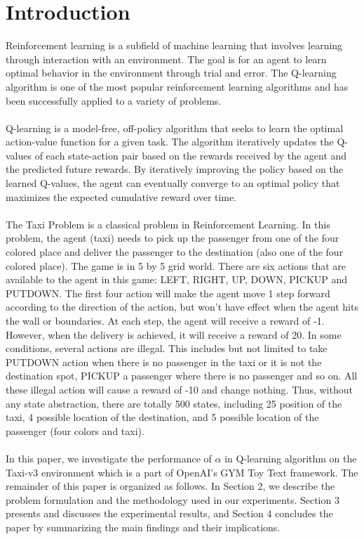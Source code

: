 \documentclass[conference]{IEEEtran}
\begin{document}
\section{Introduction}
Reinforcement learning is a subfield of machine learning that involves learning through interaction with an environment. The goal is for an agent to learn optimal behavior in the environment through trial and error. The Q-learning algorithm is one of the most popular reinforcement learning algorithms and has been successfully applied to a variety of problems. \\ \\ Q-learning \cite{1} is a model-free, off-policy algorithm that seeks to learn the optimal action-value function for a given task. The algorithm iteratively updates the Q-values of each state-action pair based on the rewards received by the agent and the predicted future rewards. By iteratively improving the policy based on the learned Q-values, the agent can eventually converge to an optimal policy that maximizes the expected cumulative reward over time. \\ \\ The Taxi Problem\cite{2} is a classical problem in Reinforcement Learning. In this problem, the agent (taxi) needs to pick up the passenger from one of the four colored place and deliver the passenger to the destination (also one of the four colored place). The game is in 5 by 5 grid world. There are six actions that are available to the agent in this game: LEFT, RIGHT, UP, DOWN, PICKUP and PUTDOWN. The first four action will make the agent move 1 step forward according to the direction of the action, but won't have effect when the agent hits the wall or boundaries. At each step, the agent will receive a reward of -1. However, when the delivery is achieved, it will receive a reward of 20. In some conditions, several actions are illegal. This includes but not limited to take PUTDOWN action when there is no passenger in the taxi or it is not the destination spot, PICKUP a passenger where there is no passenger and so on. All these illegal action will cause a reward of -10 and change nothing. Thus, without any state abstraction, there are totally 500 states, including 25 position of the taxi, 4 possible location of the destination, and 5 possible location of the passenger (four colors and taxi). \\ \\ In this paper, we investigate the performance of $\alpha$ in Q-learning algorithm on the Taxi-v3 environment \cite{3} which is a part of OpenAI's GYM Toy Text framework. The remainder of this paper is organized as follows. In Section 2, we describe the problem formulation and the methodology used in our experiments. Section 3 presents and discusses the experimental results, and Section 4 concludes the paper by summarizing the main findings and their implications.
\end{document}
